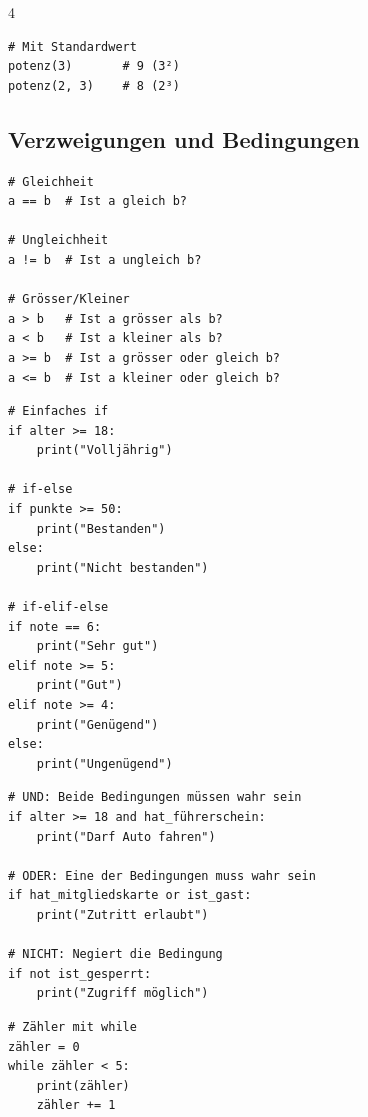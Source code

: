 \begin{landscape}
\begin{multicols*}{4}
\begin{cheatSheetBox}[title=Funktionen aufrufen]
\begin{lstlisting}
# Mit Standardwert
potenz(3)       # 9 (3²)
potenz(2, 3)    # 8 (2³)
\end{lstlisting}
		\end{cheatSheetBox}

		\columnbreak\textcolor{\cheatSheetColor}{\subsection*{Verzweigungen und Bedingungen}}

		\begin{cheatSheetBox}[title=Vergleichsoperatoren]
			\begin{lstlisting}
# Gleichheit
a == b  # Ist a gleich b?

# Ungleichheit
a != b  # Ist a ungleich b?

# Grösser/Kleiner
a > b   # Ist a grösser als b?
a < b   # Ist a kleiner als b?
a >= b  # Ist a grösser oder gleich b?
a <= b  # Ist a kleiner oder gleich b?
\end{lstlisting}
		\end{cheatSheetBox}

		\begin{cheatSheetBox}[title={if, elif, else}]
			\begin{lstlisting}
# Einfaches if
if alter >= 18:
    print("Volljährig")

# if-else
if punkte >= 50:
    print("Bestanden")
else:
    print("Nicht bestanden")

# if-elif-else
if note == 6:
    print("Sehr gut")
elif note >= 5:
    print("Gut")
elif note >= 4:
    print("Genügend")
else:
    print("Ungenügend")
\end{lstlisting}
		\end{cheatSheetBox}

		\begin{cheatSheetBox}[title=Logische Operatoren]
			\begin{lstlisting}
# UND: Beide Bedingungen müssen wahr sein
if alter >= 18 and hat_führerschein:
    print("Darf Auto fahren")

# ODER: Eine der Bedingungen muss wahr sein
if hat_mitgliedskarte or ist_gast:
    print("Zutritt erlaubt")

# NICHT: Negiert die Bedingung
if not ist_gesperrt:
    print("Zugriff möglich")
\end{lstlisting}
		\end{cheatSheetBox}

		\begin{cheatSheetBox}[title=while-Schleife]
			\begin{lstlisting}
# Zähler mit while
zähler = 0
while zähler < 5:
    print(zähler)
    zähler += 1


\end{lstlisting}
\end{cheatSheetBox}
\end{multicols*}
\end{landscape}
